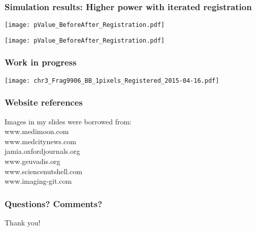 \documentclass[10pt,dvipsnames,table, notes]{beamer} %
\begin{document}
\begin{frame}
\frametitle{Simulation results: Higher power with iterated registration}
\begin{center}
\texttt{[image: pValue\_BeforeAfter\_Registration.pdf]}

\texttt{[image: pValue\_BeforeAfter\_Registration.pdf]}
\end{center}
\end{frame}

\begin{frame}
\frametitle{Work in progress}
\begin{center}
\texttt{[image: chr3\_Frag9906\_BB\_1pixels\_Registered\_2015-04-16.pdf]}
\end{center}
\end{frame}


\begin{frame}
\frametitle{Website references}
Images in my slides were borrowed from: \\
www.medimoon.com \\
www.medcitynews.com \\
jamia.oxfordjournals.org \\
www.geuvadis.org \\
www.sciencenutshell.com \\
www.imaging-git.com \\
\end{frame}

\begin{frame}
\frametitle{Questions? Comments?}

\begin{center}
Thank you!
\end{center}
\end{frame}
\end{document}
